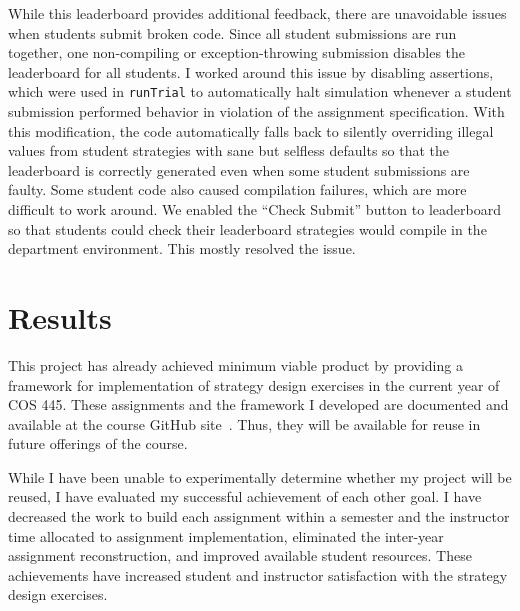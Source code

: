 \documentclass[pageno]{jpaper}
\begin{document}
While this leaderboard provides additional feedback, there are unavoidable issues when students submit broken code.
Since all student submissions are run together, one non-compiling or exception-throwing submission disables the leaderboard for all students.
I worked around this issue by disabling assertions, which were used in \texttt{runTrial} to automatically halt simulation whenever a student submission performed behavior in violation of the assignment specification.
With this modification, the code automatically falls back to silently overriding illegal values from student strategies with sane but selfless defaults so that the leaderboard is correctly generated even when some student submissions are faulty.
Some student code also caused compilation failures, which are more difficult to work around.
We enabled the ``Check Submit'' button to leaderboard so that students could check their leaderboard strategies would compile in the department environment.
This mostly resolved the issue.

\section*{Results}
This project has already achieved minimum viable product by providing a framework for implementation of strategy design exercises in the current year of COS 445.
These assignments and the framework I developed are documented and available at the course GitHub site~\cite{s18}.
Thus, they will be available for reuse in future offerings of the course.

While I have been unable to experimentally determine whether my project will be reused, I have evaluated my successful achievement of each other goal.
I have decreased the work to build each assignment within a semester and the instructor time allocated to assignment implementation, eliminated the inter-year assignment reconstruction, and improved available student resources.
These achievements have increased student and instructor satisfaction with the strategy design exercises.
\end{document}
